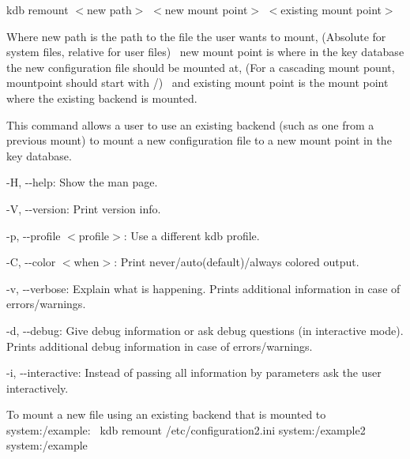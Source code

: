 {\ttfamily kdb remount $<$new path$>$ $<$new mount point$>$ $<$existing mount point$>$}

Where {\ttfamily new path} is the path to the file the user wants to mount, (Absolute for system files, relative for user files)~\newline
 {\ttfamily new mount point} is where in the key database the new configuration file should be mounted at, (For a cascading mount pount, {\ttfamily mountpoint} should start with {\ttfamily /})~\newline
 and {\ttfamily existing mount point} is the mount point where the existing backend is mounted.~\newline


This command allows a user to use an existing backend (such as one from a previous mount) to mount a new configuration file to a new mount point in the key database.~\newline



\begin{DoxyItemize}
\item {\ttfamily -\/H}, {\ttfamily -\/-\/help}\+: Show the man page.
\item {\ttfamily -\/V}, {\ttfamily -\/-\/version}\+: Print version info.
\item {\ttfamily -\/p}, {\ttfamily -\/-\/profile $<$profile$>$}\+: Use a different kdb profile.
\item {\ttfamily -\/C}, {\ttfamily -\/-\/color $<$when$>$}\+: Print never/auto(default)/always colored output.
\item {\ttfamily -\/v}, {\ttfamily -\/-\/verbose}\+: Explain what is happening. Prints additional information in case of errors/warnings.
\item {\ttfamily -\/d}, {\ttfamily -\/-\/debug}\+: Give debug information or ask debug questions (in interactive mode). Prints additional debug information in case of errors/warnings.
\item {\ttfamily -\/i}, {\ttfamily -\/-\/interactive}\+: Instead of passing all information by parameters ask the user interactively.
\end{DoxyItemize}

To mount a new file using an existing backend that is mounted to {\ttfamily system\+:/example}\+:~\newline
 {\ttfamily kdb remount /etc/configuration2.ini system\+:/example2 system\+:/example}~\newline
 